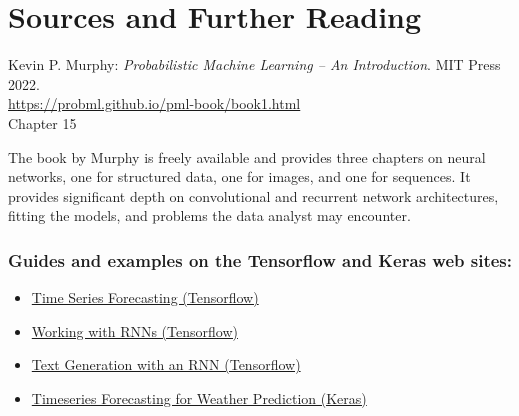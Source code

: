 %
%

\section*{Sources and Further Reading}

\begin{tcolorbox}[colback=alert]
Kevin P. Murphy: \emph{Probabilistic Machine Learning -- An Introduction}. MIT Press 2022. \\

\url{https://probml.github.io/pml-book/book1.html} \\

Chapter 15

\end{tcolorbox}

The book by Murphy is freely available and provides three chapters on neural networks, one for structured data, one for images, and one for sequences. It provides significant depth on convolutional and recurrent network architectures, fitting the models, and problems the data analyst may encounter. 

\begin{tcolorbox}[colback=alert]
\subsubsection*{Guides and examples on the Tensorflow and Keras web sites:}

\begin{itemize}
\item \href{https://www.tensorflow.org/tutorials/structured_data/time_series}{Time Series Forecasting (Tensorflow)} \\
\item \href{https://www.tensorflow.org/guide/keras/working_with_rnns}{Working with RNNs (Tensorflow)} \\
\item \href{https://www.tensorflow.org/text/tutorials/text_generation}{Text Generation with an RNN (Tensorflow)} \\
\item \href{https://keras.io/examples/timeseries/timeseries_weather_forecasting/}{Timeseries Forecasting for Weather Prediction (Keras)}
\end{itemize}
\end{tcolorbox}


